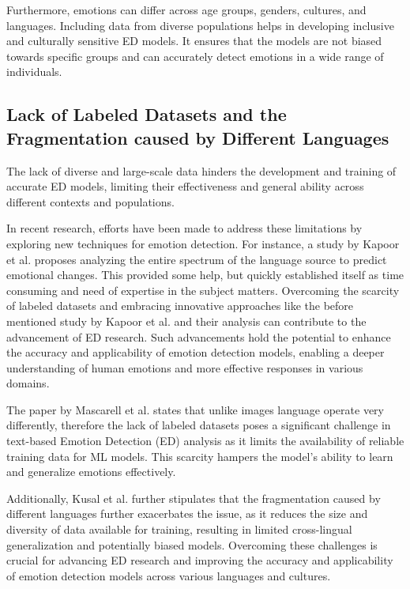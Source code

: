 \documentclass[11pt]{article}
\begin{document}
Furthermore, emotions can differ across age groups, genders, cultures, and languages. Including data from diverse populations helps in developing inclusive and culturally sensitive ED models. It ensures that the models are not biased towards specific groups and can accurately detect emotions in a wide range of individuals.

\subsection{Lack of Labeled Datasets and the Fragmentation caused by Different Languages}

The lack of diverse and large-scale data hinders the development and training of accurate ED models, limiting their effectiveness and general ability across different contexts and populations.

In recent research, efforts have been made to address these limitations by exploring new techniques for emotion detection. For instance, a study by Kapoor\cite{KAPOOR2023120882} et al. proposes analyzing the entire spectrum of the language source to predict emotional changes. This provided some help, but quickly established itself as time consuming and need of expertise in the subject matters. Overcoming the scarcity of labeled datasets and embracing innovative approaches like the before mentioned study by Kapoor\cite{KAPOOR2023120882} et al. and their analysis can contribute to the advancement of ED research. Such advancements hold the potential to enhance the accuracy and applicability of emotion detection models, enabling a deeper understanding of human emotions and more effective responses in various domains.

The paper by Mascarell\cite{mascarell-etal-2021-stance} et al. states that unlike images language operate very differently, therefore the lack of labeled datasets poses a significant challenge in text-based Emotion Detection (ED) analysis as it limits the availability of reliable training data for ML models. This scarcity hampers the model's ability to learn and generalize emotions effectively.

Additionally, Kusal et al. further stipulates \cite{kusal} that the fragmentation caused by different languages further exacerbates the issue, as it reduces the size and diversity of data available for training, resulting in limited cross-lingual generalization and potentially biased models. Overcoming these challenges is crucial for advancing ED research and improving the accuracy and applicability of emotion detection models across various languages and cultures.
\end{document}
